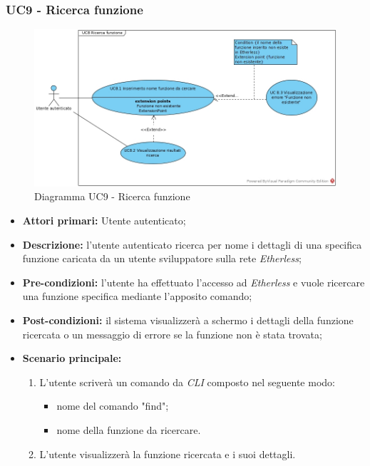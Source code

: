 \subsubsection{UC9 - Ricerca funzione}
\begin{figure}[h]
	\centering
	\includegraphics[width=\linewidth]{res/img/UC8.jpg}
	\caption{Diagramma UC9 - Ricerca funzione}
\end{figure}
\begin{itemize}
	\item \textbf{Attori primari:} Utente autenticato;
	\item \textbf{Descrizione:} l'utente autenticato ricerca per nome i dettagli di una specifica funzione caricata da un utente sviluppatore sulla rete \textit{Etherless};
	\item \textbf{Pre-condizioni:} l'utente ha effettuato l'accesso ad \textit{Etherless} e vuole ricercare una funzione specifica mediante l'apposito comando;
	\item \textbf{Post-condizioni:} il sistema visualizzerà a schermo i dettagli della funzione ricercata o un messaggio di errore se la funzione non è stata trovata;
	\item \textbf{Scenario principale:}
	\begin{enumerate}
		\item L'utente scriverà un comando da \textit{CLI\glos} composto nel seguente modo:
		\begin{itemize}
			\item nome del comando "find";
			\item nome della funzione da ricercare.
		\end{itemize}
        \item L'utente visualizzerà la funzione ricercata e i suoi dettagli.
	\end{enumerate}
\end{itemize}
